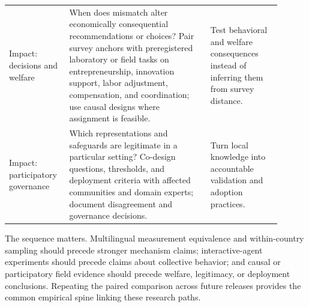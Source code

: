 \begin{longtable}{>{\raggedright\arraybackslash}p{0.18\linewidth}>{\raggedright\arraybackslash}p{0.48\linewidth}>{\raggedright\arraybackslash}p{0.24\linewidth}}
\addlinespace
Impact: decisions and welfare & When does mismatch alter economically consequential recommendations or choices? Pair survey anchors with preregistered laboratory or field tasks on entrepreneurship, innovation support, labor adjustment, compensation, and coordination; use causal designs where assignment is feasible. & Test behavioral and welfare consequences instead of inferring them from survey distance. \\
\addlinespace
Impact: participatory governance & Which representations and safeguards are legitimate in a particular setting? Co-design questions, thresholds, and deployment criteria with affected communities and domain experts; document disagreement and governance decisions. & Turn local knowledge into accountable validation and adoption practices. \\
\bottomrule
\end{longtable}
\normalsize

The sequence matters. Multilingual measurement equivalence and within-country sampling
should precede stronger mechanism claims; interactive-agent experiments should precede
claims about collective behavior; and causal or participatory field evidence should
precede welfare, legitimacy, or deployment conclusions. Repeating the paired comparison
across future releases provides the common empirical spine linking these research paths.
\FloatBarrier
